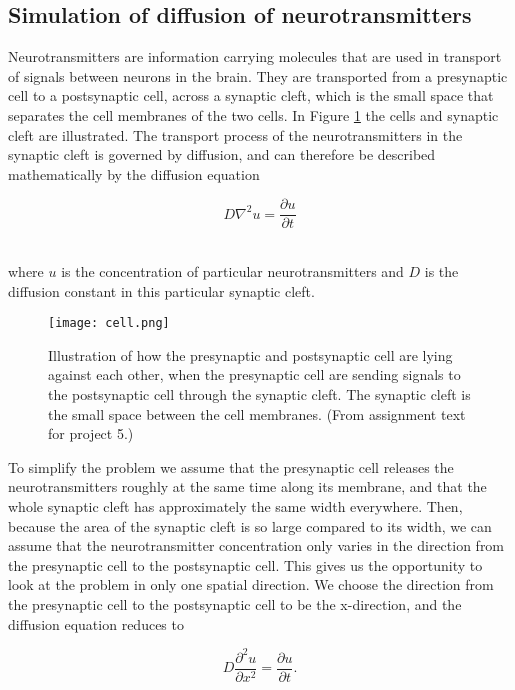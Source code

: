 \documentclass[12pt]{article}
\begin{document}
\begin{flushleft}
\subsection{Simulation of diffusion of neurotransmitters}
Neurotransmitters are information carrying molecules that are used in transport of signals between neurons in the brain. They are transported from a presynaptic cell to a postsynaptic cell, across a synaptic cleft, which is the small space that separates the cell membranes of the two cells. In Figure \ref{fig:cell} the cells and synaptic cleft are illustrated. The transport process of the neurotransmitters in the synaptic cleft is governed by diffusion, and can therefore be described mathematically by the diffusion equation

\vspace{5mm}
$$D\nabla^2u = \frac{\partial u}{\partial t}$$\\
\vspace{5mm}

where $u$ is the concentration of particular neurotransmitters and $D$ is the diffusion constant in this particular synaptic cleft.
\begin{figure}[!h]
\begin{center}
\texttt{[image: cell.png]}
\caption{\label{fig:cell}Illustration of how the presynaptic and postsynaptic cell are lying against each other, when the presynaptic cell are sending signals to the postsynaptic cell through the synaptic cleft. The synaptic cleft is the small space between the cell membranes. (From assignment text for project 5.)}
\end{center}
\end{figure}

To simplify the problem we assume that the presynaptic cell releases the neurotransmitters roughly at the same time along its membrane, and that the whole synaptic cleft has approximately the same width everywhere. Then, because the area of the synaptic cleft is so large compared to its width, we can assume that the neurotransmitter concentration only varies in the direction from the presynaptic cell to the postsynaptic cell. This gives us the opportunity to look at the problem in only one spatial direction. We choose the direction from the presynaptic cell to the postsynaptic cell to be the x-direction, and the diffusion equation reduces to

\vspace{5mm}
$$D\frac{\partial^2 u}{\partial x^2} = \frac{\partial u}{\partial t}.$$\\
\vspace{5mm}


\end{flushleft}
\end{document}
